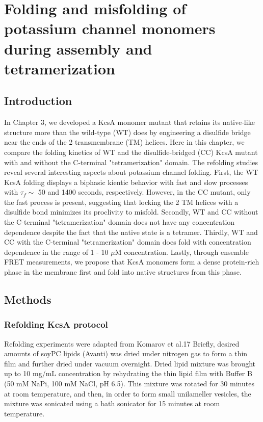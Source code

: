 
\chapter{Folding and misfolding of potassium channel monomers during assembly and tetramerization}
\section{Introduction}

In Chapter 3, we developed a KcsA monomer mutant that retains its native-like structure more than the wild-type (WT) does by engineering a disulfide bridge near the ends of the 2 transmembrane (TM) helices. Here in this chapter, we compare the folding kinetics of WT and the disulfide-bridged (CC) KcsA mutant with and without the C-terminal "tetramerization" domain. The refolding studies reveal several interesting aspects about potassium channel folding. First, the WT KcsA folding displays a biphasic kientic behavior with fast and slow processes with $\tau_{f} \sim$ 50 and 1400 seconds, respectively. However, in the CC mutant, only the fast process is present, suggesting that locking the 2 TM helices with a disulfide bond minimizes its proclivity to misfold. Secondly, WT and CC without the C-terminal "tetramerization" domain does not have any concentration dependence despite the fact that the native state is a tetramer. Thirdly, WT and CC with the C-terminal "tetramerization" domain does fold with concentration dependence in the range of 1 - 10 $\mu$M concentration. Lastly, through ensemble FRET measurements, we propose that KcsA monomers form a dense protein-rich phase in the membrane first and fold into native structures from this phase.

\section{Methods}
\subsection{Refolding KcsA protocol}

Refolding experiments were adapted from Komarov et al.17 Briefly, desired amounts of soyPC lipids (Avanti) was dried under nitrogen gas to form a thin film and further dried under vacuum overnight. Dried lipid mixture was brought up to 10 mg/mL concentration by rehydrating the thin lipid film with Buffer B (50 mM NaPi, 100 mM NaCl, pH 6.5). This mixture was rotated for 30 minutes at room temperature, and then, in order to form small unilameller vesicles, the mixture was sonicated using a bath sonicator for 15 minutes at room temperature.

